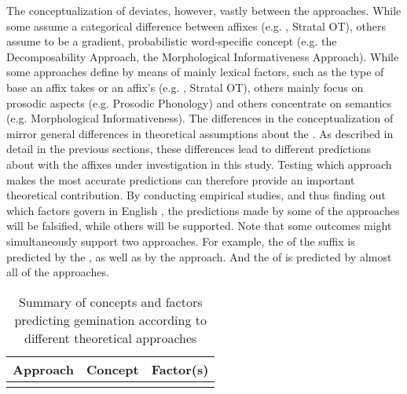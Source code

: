 {{{ The conceptualization of  deviates, however, vastly between the approaches. While some assume a categorical difference between affixes (e.g. , Stratal OT), others assume  to be a gradient, probabilistic word-specific concept (e.g. the Decomposability Approach, the Morphological Informativeness Approach). 
 While some approaches define  by means of mainly lexical factors, such as the type of base an affix takes or an affix's  (e.g. , Stratal OT), others mainly focus on prosodic aspects (e.g. Prosodic Phonology) and others concentrate on semantics (e.g. Morphological Informativeness).  The differences in the conceptualization of  mirror general differences in theoretical assumptions about the . As described in detail in the previous sections, these differences lead to different predictions about  with the affixes under investigation in this study.
 Testing which approach makes the most accurate predictions can therefore provide an important theoretical contribution. 
 By conducting empirical studies, and thus finding out which factors govern  in English , the predictions made by some of the approaches will be falsified, while others will be supported. Note that some outcomes might simultaneously support two approaches. For example, the  of the suffix  is predicted by the , as well as by the  approach. And the  of  is predicted by almost all of the approaches.



\begin{table*}

	\caption{{Summary of concepts and factors predicting gemination according to different theoretical approaches}}
	\label{tbl:Factors predicting gemination}

	
		\begin{tabularx}{\textwidth}{lll}
				\lsptoprule
			\textbf{Approach }& \textbf{Concept }& \textbf{Factor(s)} \\ 
			\midrule

			\\
			

\end{tabularx}
\end{table*}}}}

